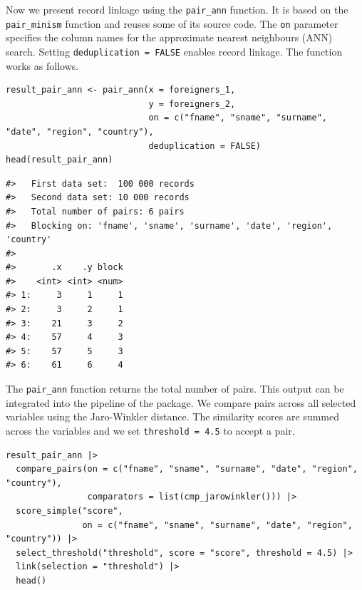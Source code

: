 Now we present record linkage using the \texttt{pair\_ann} function. It is based on the \texttt{pair\_minism} function and reuses some of its source code. The \texttt{on} parameter specifies the column names for the approximate nearest neighbours (ANN) search. Setting \texttt{deduplication\ =\ FALSE} enables record linkage. The function works as follows.

\begin{verbatim}
result_pair_ann <- pair_ann(x = foreigners_1,
                            y = foreigners_2,
                            on = c("fname", "sname", "surname", "date", "region", "country"),
                            deduplication = FALSE)
head(result_pair_ann)
\end{verbatim}

\begin{verbatim}
#>   First data set:  100 000 records
#>   Second data set: 10 000 records
#>   Total number of pairs: 6 pairs
#>   Blocking on: 'fname', 'sname', 'surname', 'date', 'region', 'country'
#> 
#>       .x    .y block
#>    <int> <int> <num>
#> 1:     3     1     1
#> 2:     3     2     1
#> 3:    21     3     2
#> 4:    57     4     3
#> 5:    57     5     3
#> 6:    61     6     4
\end{verbatim}

The \texttt{pair\_ann} function returns the total number of pairs. This output can be integrated into the pipeline of the  package. We compare pairs across all selected variables using the Jaro-Winkler distance. The similarity scores are summed across the variables and we set \texttt{threshold\ =\ 4.5} to accept a pair.

\begin{verbatim}
result_pair_ann |>
  compare_pairs(on = c("fname", "sname", "surname", "date", "region", "country"),
                comparators = list(cmp_jarowinkler())) |>
  score_simple("score",
               on = c("fname", "sname", "surname", "date", "region", "country")) |>
  select_threshold("threshold", score = "score", threshold = 4.5) |>
  link(selection = "threshold") |>
  head()
\end{verbatim}

